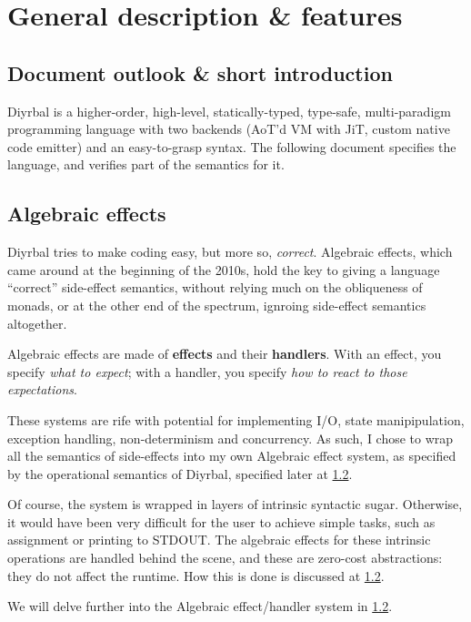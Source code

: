 \documentclass[a4paper,12pt]{article}
\newcommand{\nm}{Diyrbal\xspace}
\begin{document}
\section{General description \& features}

\subsection{Document outlook \& short introduction}

\nm is a higher-order, high-level, statically-typed, type-safe, multi-paradigm programming language with two backends (AoT'd VM with JiT, custom native code emitter) and an easy-to-grasp syntax. The following document specifies the language, and verifies part of the semantics for it.


\subsection{Algebraic effects}

\nm tries to make coding easy, but more so, \textit{correct}. Algebraic effects, which came around at the beginning of the 2010s, hold the key to giving a language ``correct'' side-effect semantics, without relying much on the obliqueness of monads, or at the other end of the spectrum, ignroing side-effect semantics altogether.

Algebraic effects are made of \textbf{effects} and their \textbf{handlers}. With an effect, you specify \textit{what to expect}; with a handler, you specify \textit{how to react to those expectations}.

These systems are rife with potential for implementing I/O, state manipipulation, exception handling, non-determinism and concurrency. As such, I chose to wrap all the semantics of side-effects into my own Algebraic effect system, as specified by the operational semantics of \nm, specified later at \cref{}.

Of course, the system is wrapped in layers of intrinsic syntactic sugar. Otherwise, it would have been very difficult for the user to achieve simple tasks, such as assignment or printing to STDOUT. The algebraic effects for these intrinsic operations are handled behind the scene, and these are zero-cost abstractions: they do not affect the runtime. How this is done is discussed at \cref{}.

We will delve further into the Algebraic effect/handler system in \cref{}.
\end{document}
